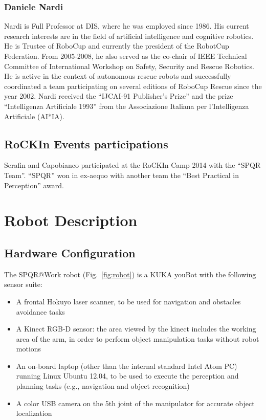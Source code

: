 \documentclass[conference]{IEEEtran}
\begin{document}
\subsubsection*{Daniele Nardi}
Nardi is Full Professor at DIS, where he was employed since 1986. His current research interests are in the field of artificial intelligence and cognitive robotics. He is Trustee of RoboCup and currently the president of the RobotCup Federation.  From 2005-2008, he also served as the co-chair of IEEE Technical Committee of International Workshop on Safety, Security and Rescue Robotics.  He is active in the context of autonomous rescue robots and successfully coordinated a team participating on several editions of RoboCup Rescue since the year 2002.  
Nardi received the ``IJCAI-91 Publisher's Prize'' and the prize ``Intelligenza Artificiale 1993'' from the Associazione Italiana per l'Intelligenza Artificiale (AI*IA).


\subsection{RoCKIn Events participations}
Serafin and Capobianco participated at the RoCKIn Camp 2014 with the ``SPQR Team''. ``SPQR'' won in ex-aequo with another team the ``Best Practical in Perception'' award.

\section{Robot Description}

\subsection{Hardware Configuration}

The SPQR@Work robot (Fig.~\ref{fig:robot}) is a KUKA youBot with the following sensor suite:

\begin{itemize}
 \item A frontal Hokuyo laser scanner, to be used for navigation and obstacles avoidance tasks
 \item A Kinect RGB-D sensor: the area viewed by the kinect includes the working area of the arm, in order to perform object manipulation tasks without robot motions
 \item An on-board laptop (other than the internal standard Intel Atom PC) running Linux Ubuntu 12.04, to be used to execute the perception and planning tasks (e.g., navigation and object recognition)
 \item A color USB camera on the 5th joint of the manipulator for accurate object localization
\end{itemize}
 
\end{document}
